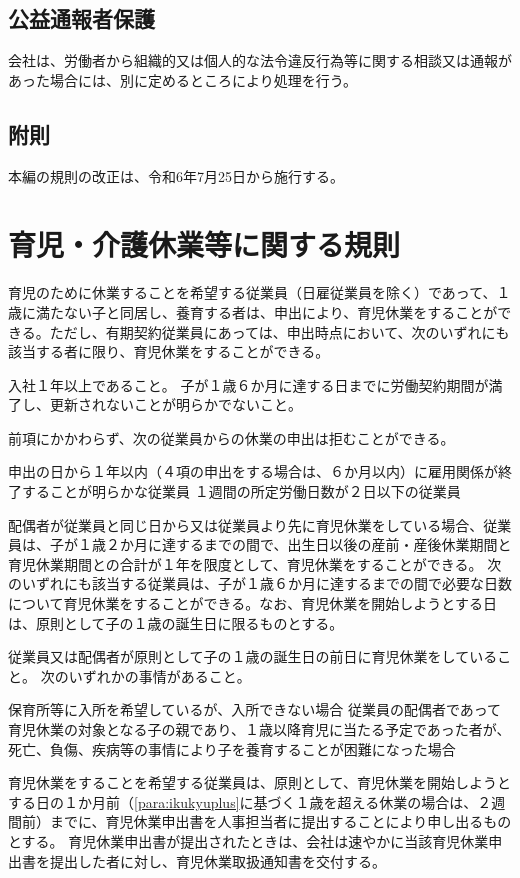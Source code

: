 \documentclass[10pt,a4paper,uplatex]{jsarticle}
\begin{document}
\subsection{公益通報者保護}

会社は、労働者から組織的又は個人的な法令違反行為等に関する相談又は通報があった場合には、別に定めるところにより処理を行う。

\subsection*{附則}
本編の規則の改正は、令和6年7月25日から施行する。



\clearpage
\section{育児・介護休業等に関する規則}

育児のために休業することを希望する従業員（日雇従業員を除く）であって、１歳に満たない子と同居し、養育する者は、申出により、育児休業をすることができる。ただし、有期契約従業員にあっては、申出時点において、次のいずれにも該当する者に限り、育児休業をすることができる。
\label{para:ChildcareLayoff}
\begin{enumerate}
    \itm 入社１年以上であること。
    \itm 子が１歳６か月に達する日までに労働契約期間が満了し、更新されないことが明らかでないこと。
\end{enumerate}
\term 前項にかかわらず、次の従業員からの休業の申出は拒むことができる。
\begin{enumerate}
    \itm 申出の日から１年以内（４項の申出をする場合は、６か月以内）に雇用関係が終了することが明らかな従業員
    \itm １週間の所定労働日数が２日以下の従業員
\end{enumerate}
\term 配偶者が従業員と同じ日から又は従業員より先に育児休業をしている場合、従業員は、子が１歳２か月に達するまでの間で、出生日以後の産前・産後休業期間と育児休業期間との合計が１年を限度として、育児休業をすることができる。
\label{para:ikukyuplus}
\term 次のいずれにも該当する従業員は、子が１歳６か月に達するまでの間で必要な日数について育児休業をすることができる。なお、育児休業を開始しようとする日は、原則として子の１歳の誕生日に限るものとする。
\begin{enumerate}
    \itm 従業員又は配偶者が原則として子の１歳の誕生日の前日に育児休業をしていること。
    \itm 次のいずれかの事情があること。
    \begin{enumerate}
        \itm 保育所等に入所を希望しているが、入所できない場合
        \itm 従業員の配偶者であって育児休業の対象となる子の親であり、１歳以降育児に当たる予定であった者が、死亡、負傷、疾病等の事情により子を養育することが困難になった場合
    \end{enumerate}
\end{enumerate}
\term 育児休業をすることを希望する従業員は、原則として、育児休業を開始しようとする日の１か月前（\ref{para:ikukyuplus}に基づく１歳を超える休業の場合は、２週間前）までに、育児休業申出書を人事担当者に提出することにより申し出るものとする。
\term 育児休業申出書が提出されたときは、会社は速やかに当該育児休業申出書を提出した者に対し、育児休業取扱通知書を交付する。
\end{document}
